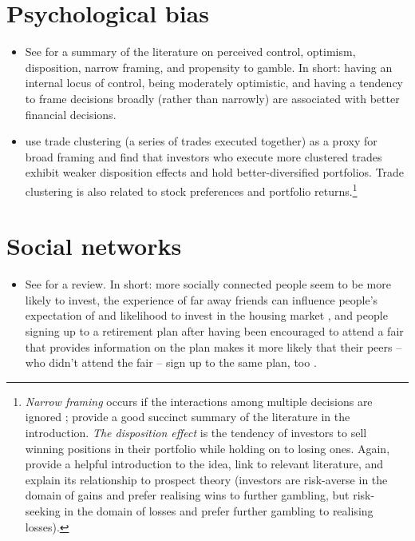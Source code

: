 \documentclass[a4paper, 11pt]{report}
\begin{document}
\section{Psychological bias}
\begin{itemize}
 	\item See \citet{agarwal2017shapes} for a summary of the literature on perceived control, optimism, disposition, narrow framing, and propensity to gamble. In short: having an internal locus of control, being moderately optimistic, and having a tendency to frame decisions broadly (rather than narrowly) are associated with better financial decisions.

 	\item \citet{kumar2008decision} use trade clustering (a series of trades executed together) as a proxy for broad framing and find that investors who execute more clustered trades exhibit weaker disposition effects and hold better-diversified portfolios. Trade clustering is also related to stock preferences and portfolio returns.\footnote{\textit{Narrow framing} occurs if the interactions among multiple decisions are ignored \citep{kahneman2003maps, thaler1985, thaler1999mental,read1999choice}; \citet{kumar2008decision} provide a good succinct summary of the literature in the introduction. \textit{The disposition effect} is the tendency of investors to sell winning positions in their portfolio while holding on to losing ones. Again, \citet{kumar2008decision} provide a helpful introduction to the idea, link to relevant literature, and explain its relationship to prospect theory (investors are risk-averse in the domain of gains and prefer realising wins to further gambling, but risk-seeking in the domain of losses and prefer further gambling to realising losses).}
 \end{itemize}

\section{Social networks}
\begin{itemize}
	\item See \citet{agarwal2017shapes} for a review. In short: more socially connected people seem to be more likely to invest, the experience of far away friends can influence people's expectation of and likelihood to invest in the housing market \citep{bailey2016social}, and people signing up to a retirement plan after having been encouraged to attend a fair that provides information on the plan makes it more likely that their peers -- who didn't attend the fair -- sign up to the same plan, too \citep{duflo2003role}.
\end{itemize}
\end{document}

